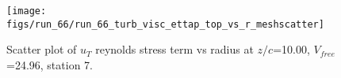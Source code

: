 \begin{figure}[H]
\centering
\texttt{[image: figs/run\_66/run\_66\_turb\_visc\_ettap\_top\_vs\_r\_meshscatter]}
\caption{Scatter plot of $
u_T$ reynolds stress term vs radius at $z/c$=10.00, $V_{free}$=24.96, station 7.}
\end{figure}


